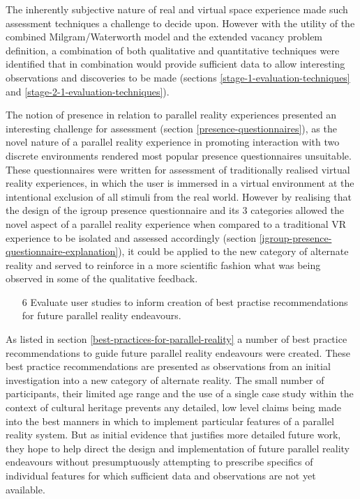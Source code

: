 The inherently subjective nature of real and virtual space experience made such assessment techniques a challenge to decide upon. However with the utility of the combined Milgram/Waterworth model and the extended vacancy problem definition, a combination of both qualitative and quantitative techniques were identified that in combination would provide sufficient data to allow interesting observations and discoveries to be made (sections \ref{stage-1-evaluation-techniques} and \ref{stage-2-1-evaluation-techniques}).

The notion of presence in relation to parallel reality experiences presented an interesting challenge for assessment (section \ref{presence-questionnaires}), as the novel nature of a parallel reality experience in promoting interaction with two discrete environments rendered most popular presence questionnaires unsuitable. These questionnaires were written for assessment of traditionally realised virtual reality experiences, in which the user is immersed in a virtual environment at the intentional exclusion of all stimuli from the real world. However by realising that the design of the igroup presence questionnaire and its 3 categories allowed the novel aspect of a parallel reality experience when compared to a traditional VR experience to be isolated and assessed accordingly (section \ref{igroup-presence-questionnaire-explanation}), it could be applied to the new category of alternate reality and served to reinforce in a more scientific fashion what was being observed in some of the qualitative feedback.

\begin{enumerate}
	\item[6] Evaluate user studies to inform creation of best practise recommendations for future parallel reality endeavours.
\end{enumerate}

As listed in section \ref{best-practices-for-parallel-reality} a number of best practice recommendations to guide future parallel reality endeavours were created. These best practice recommendations are presented as observations from an initial investigation into a new category of alternate reality. The small number of participants, their limited age range and the use of a single case study within the context of cultural heritage prevents any detailed, low level claims being made into the best manners in which to implement particular features of a parallel reality system. But as initial evidence that justifies more detailed future work, they hope to help direct the design and implementation of future parallel reality endeavours without presumptuously attempting to prescribe specifics of individual features for which sufficient data and observations are not yet available.


